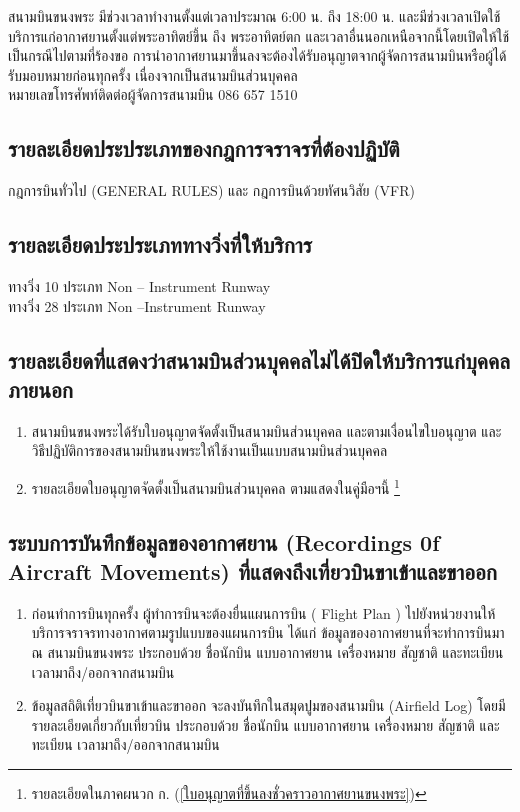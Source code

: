สนามบินขนงพระ มีช่วงเวลาทำงานตั้งแต่เวลาประมาณ 6:00 น. ถึง 18:00 น. และมีช่วงเวลาเปิดใช้บริการแก่อากาศยานตั้งแต่พระอาทิตย์ขึ้น ถึง พระอาทิตย์ตก และเวลาอื่นนอกเหนือจากนี้โดยเปิดให้ใช้เป็นกรณีไปตามที่ร้องขอ  การนำอากาศยานมาขึ้นลงจะต้องได้รับอนุญาตจากผู้จัดการสนามบินหรือผู้ได้รับมอบหมายก่อนทุกครั้ง เนื่องจากเป็นสนามบินส่วนบุคคล \\
	
\noindent หมายเลขโทรศัพท์ติดต่อผู้จัดการสนามบิน 086 657 1510 

\subsection{รายละเอียดประประเภทของกฎการจราจรที่ต้องปฏิบัติ}

กฎการบินทั่วไป (GENERAL RULES) และ กฎการบินด้วยทัศนวิสัย (VFR)

\subsection{รายละเอียดประประเภททางวิ่งที่ให้บริการ}

ทางวิ่ง 10 ประเภท Non – Instrument Runway \\
ทางวิ่ง 28 ประเภท Non –Instrument Runway 

\subsection{รายละเอียดที่แสดงว่าสนามบินส่วนบุคคลไม่ได้ปิดให้บริการแก่บุคคลภายนอก}

\begin{enumerate}
	\item สนามบินขนงพระได้รับใบอนุญาตจัดตั้งเป็นสนามบินส่วนบุคคล และตามเงื่อนไขใบอนุญาต และวิธีปฏิบัติการของสนามบินขนงพระให้ใช้งานเป็นแบบสนามบินส่วนบุคคล
	\item รายละเอียดใบอนุญาตจัดตั้งเป็นสนามบินส่วนบุคคล  ตามแสดงในคู่มือฯนี้ \footnote{รายละเอียดในภาคผนวก ก. (\ref{ใบอนุญาตที่ขึ้นลงชั่วคราวอากาศยานขนงพระ})}
	 
\end{enumerate}

\subsection{ระบบการบันทึกข้อมูลของอากาศยาน (Recordings 0f Aircraft Movements) ที่แสดงถึงเที่ยวบินขาเข้าและขาออก}

\begin{enumerate}
	\item ก่อนทำการบินทุกครั้ง ผู้ทำการบินจะต้องยื่นแผนการบิน ( Flight Plan ) ไปยังหน่วยงานให้บริการจราจรทางอากาศตามรูปแบบของแผนการบิน ได้แก่ ข้อมูลของอากาศยานที่จะทำการบินมา ณ สนามบินขนงพระ ประกอบด้วย ชื่อนักบิน แบบอากาศยาน เครื่องหมาย สัญชาติ และทะเบียน เวลามาถึง/ออกจากสนามบิน
	\item ข้อมูลสถิติเที่ยวบินขาเข้าและขาออก  จะลงบันทึกในสมุดปูมของสนามบิน (Airfield Log) โดยมี รายละเอียดเกี่ยวกับเที่ยวบิน ประกอบด้วย ชื่อนักบิน แบบอากาศยาน เครื่องหมาย สัญชาติ และทะเบียน เวลามาถึง/ออกจากสนามบิน 
\end{enumerate}

